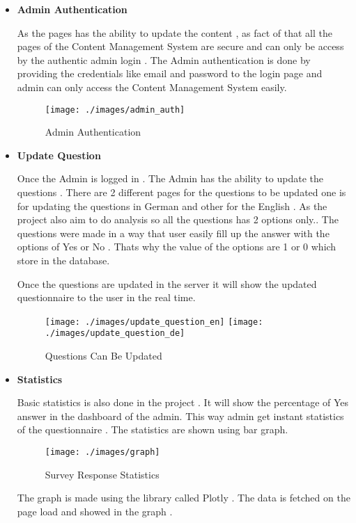 \begin{itemize}
	\item \textbf{Admin Authentication}
	\par As the pages has the ability to update the content , as fact of that all the pages of the Content Management System are secure and can only be access by the authentic admin login . The Admin authentication is done by providing the credentials like email and password to the login page and admin can only access the Content Management System easily.
	\begin{figure}[H]
		\centering
		\texttt{[image: ./images/admin\_auth]}
		\caption{Admin Authentication}
		\label{figure1:cms_admin_authentication}
	\end{figure}
	\item \textbf{Update Question}
	\par Once the Admin is logged in . The Admin has the ability to update the questions . There are 2 different pages for the questions to be updated one is for updating the questions in German and other for the English . As the project also aim to do analysis so all the questions has 2 options only.. The questions were made in a way that user easily fill up the answer with the options of Yes or No . Thats why the value of the options are 1 or 0 which store in the database.
	\par Once the questions are updated in the server it will show the updated questionnaire to the user in the real time.
	\begin{figure}[H]
		\centering
		\texttt{[image: ./images/update\_question\_en]}
		\texttt{[image: ./images/update\_question\_de]}
		\caption{Questions Can Be Updated}
		\label{figure1:cms_update_questions}
	\end{figure}
	\item \textbf{Statistics}
	\par Basic statistics is also done in the project . It will show the percentage of Yes answer in the dashboard of the admin. This way admin get instant statistics of the questionnaire . The statistics are shown using bar graph.
	\begin{figure}[H]
		\centering
		\texttt{[image: ./images/graph]}
		\caption{Survey Response Statistics}
		\label{figure1:cms_survey_response_stats}
	\end{figure}
	\par The graph is made using the library called Plotly\cite{Plotly} . The data is fetched on the page load and showed in the graph .

\end{itemize}
